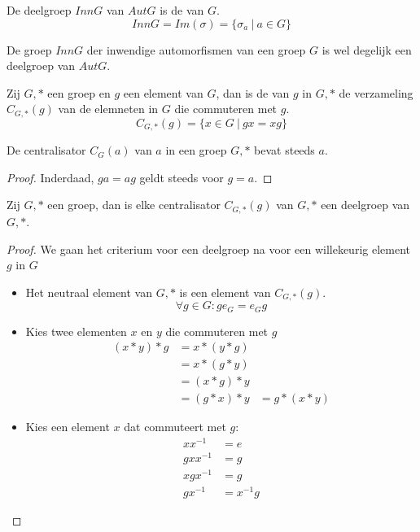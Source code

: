 \documentclass[main.tex]{subfiles}
\begin{document}
\begin{de}
  \label{de:inn-g}
  De deelgroep $InnG$ van $AutG$ is de  van $G$.
  \[ InnG = Im(\sigma) = \{ \sigma_{a}\ |\ a \in G \} \]
\end{de}

\begin{st}
  De groep $InnG$ der inwendige automorfismen van een groep $G$ is wel degelijk een deelgroep van $AutG$.
\end{st}


\begin{de}
  Zij $G,*$ een groep en $g$ een element van $G$, dan is de  van $g$ in $G,*$ de verzameling $C_{G,*}(g)$ van de elemneten in $G$ die commuteren met $g$.
  \[ C_{G,*}(g) = \{ x \in G\ |\ gx = xg \} \]
\end{de}

\begin{ei}
  \label{ei:centralisator-bevat-element}
  De centralisator $C_{G}(a)$ van $a$ in een groep $G,*$ bevat steeds $a$.
  
  \begin{proof}
    Inderdaad, $ga = ag$ geldt steeds voor $g=a$.
  \end{proof}
\end{ei}

\begin{ei}
  \label{ei:centralisator-is-deelgroep}
  Zij $G,*$ een groep, dan is elke centralisator $C_{G,*}(g)$ van $G,*$ een deelgroep van $G,*$.
  \begin{proof}
    We gaan het criterium voor een deelgroep na voor een willekeurig element $g$ in $G$
    \begin{itemize}
    \item Het neutraal element van $G,*$ is een element van $C_{G,*}(g)$.
      \[ \forall g\in G: ge_{G} = e_{G}g \]
    \item Kies twee elementen $x$ en $y$ die commuteren met $g$
      \[
      \begin{array}{rll}
        (x*y)*g &= x*(y*g)&\\
                &= x*(g*y) &\\
                &= (x*g)*y &\\
                &= (g*x)*y &= g*(x*y)
      \end{array}
      \]
    \item Kies een element $x$ dat commuteert met $g$:
      \[
      \begin{array}{rl}
        xx^{-1} &= e\\
        gxx^{-1} &= g\\
        xgx^{-1} &= g\\
        gx^{-1} &= x^{-1}g
      \end{array}
      \]
    \end{itemize}
  \end{proof}
\end{ei}
\end{document}
